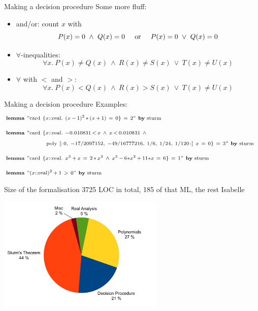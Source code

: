 \documentclass[%
	sans,			%
	mathsans,		%
	10pt,
	t		%
	slidescentered,%
]{beamer}
\newcommand{\lem}{\textbf{lemma}}
\newcommand{\card}{\textrm{card}}
\newcommand{\real}{\textrm{real}}
\begin{document}
\begin{frame}{Making a decision procedure}
Some more fluff:
\begin{itemize}
\item and/or: count $x$ with $$P(x)=0\ \wedge\ Q(x)=0\hskip5mm\mathrm{or}\hskip5mm P(x)=0\ \vee\ Q(x)=0$$
\item $\forall$-inequalities: $$\forall x.\ P(x) \neq Q(x)\ \wedge\ R(x) \neq S(x)\ \vee\ T(x)\neq U(x)$$
\item $\forall$ with $<$ and $>$: $$\forall x.\ P(x) < Q(x)\ \wedge\ R(x) > S(x)\ \vee\ T(x)\neq U(x)$$
\end{itemize}
\end{frame}

\begin{frame}{\hskip-2mm Making a decision procedure}
\hskip-2mm Examples:
\begin{align*}
&\hskip-2mm\scriptstyle
\lem\ "\card\ \{x::\real.\ (x\, -\, 1)^2\, *\, (x\, +\, 1)\ =\ 0\}\ =\ 2"\ \textrm{\textbf{by}\ sturm}\\[2mm]
&\hskip-2mm\scriptstyle\textbf{lemma}\ "\mathrm{card}\ \{x::\mathrm{real}.\ -0.010831\, <\, x\ \wedge\ x\, <\, 0.010831\ \wedge\\
&\hskip-2mm\scriptstyle\hskip20mm \mathrm{poly}\ [:\,0,\  -17/2097152,\  -49/16777216,\  1/6,\  1/24,\  1/120\,:]\ x\ =\ 0\}\  =\  3"\ \textrm{\textbf{by}\ sturm}\\[2mm]
&\hskip-2mm\scriptstyle\lem\ "\card\ \{x::\real.\ x^3\, +\, x\ =\ 2\,*\,x^2\ \wedge\ x^3\,-\,6*x^2\,+\,11*x\ =\ 6\}\  =\  1"\ \textrm{\textbf{by}\ sturm}\\[2mm]
&\hskip-2mm\scriptstyle\lem\ "(x::\real)^2\,+\,1\ >\ 0"\ \textrm{\textbf{by}\ sturm}
\end{align*}
\end{frame}

\begin{frame}{Size of the formalisation}
3725 LOC in total, 185 of that ML, the rest Isabelle
\begin{center}
\includegraphics[width=8cm]{plot.pdf}
\end{center}
\end{frame}
\end{document}
